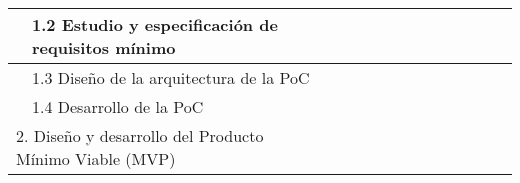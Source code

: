 \documentclass{subfiles}
\begin{document}
\begin{landscape}
\begin{table}
\begin{tabular}{|ll|ccc|ccccccccc|}
              & 1.2 Estudio y especificación de requisitos mínimo             & \multicolumn{1}{c|}{\cellcolor[HTML]{9B9B9B}} & \multicolumn{1}{c|}{}                         &                          & \multicolumn{1}{c|}{}                         & \multicolumn{1}{c|}{}                         & \multicolumn{1}{c|}{}                         & \multicolumn{1}{c|}{}                         & \multicolumn{1}{c|}{}                         & \multicolumn{1}{c|}{}                         & \multicolumn{1}{c|}{}                         & \multicolumn{1}{c|}{}                         &                          \\ \hline
              & 1.3 Diseño de la arquitectura de la PoC                       & \multicolumn{1}{c|}{\cellcolor[HTML]{9B9B9B}} & \multicolumn{1}{c|}{\cellcolor[HTML]{9B9B9B}} &                          & \multicolumn{1}{c|}{}                         & \multicolumn{1}{c|}{}                         & \multicolumn{1}{c|}{}                         & \multicolumn{1}{c|}{}                         & \multicolumn{1}{c|}{}                         & \multicolumn{1}{c|}{}                         & \multicolumn{1}{c|}{}                         & \multicolumn{1}{c|}{}                         &                          \\ \hline
              & 1.4 Desarrollo de la PoC                                      & \multicolumn{1}{c|}{}                         & \multicolumn{1}{c|}{\cellcolor[HTML]{9B9B9B}} & \cellcolor[HTML]{9B9B9B} & \multicolumn{1}{c|}{}                         & \multicolumn{1}{c|}{}                         & \multicolumn{1}{c|}{}                         & \multicolumn{1}{c|}{}                         & \multicolumn{1}{c|}{}                         & \multicolumn{1}{c|}{}                         & \multicolumn{1}{c|}{}                         & \multicolumn{1}{c|}{}                         &                          \\ \hline
\multicolumn{2}{|l|}{2. Diseño y desarrollo del Producto Mínimo Viable (MVP)} & \multicolumn{1}{c|}{}                         & \multicolumn{1}{c|}{}                         & \cellcolor[HTML]{656565} & \multicolumn{1}{c|}{\cellcolor[HTML]{656565}} & \multicolumn{1}{c|}{\cellcolor[HTML]{656565}} & \multicolumn{1}{c|}{\cellcolor[HTML]{656565}} & \multicolumn{1}{c|}{}                         & \multicolumn{1}{c|}{}                         & \multicolumn{1}{c|}{}                         & \multicolumn{1}{c|}{}                         & \multicolumn{1}{c|}{}                         &                          \\ \hline

\end{tabular}
\end{table}
\end{landscape}
\end{document}
